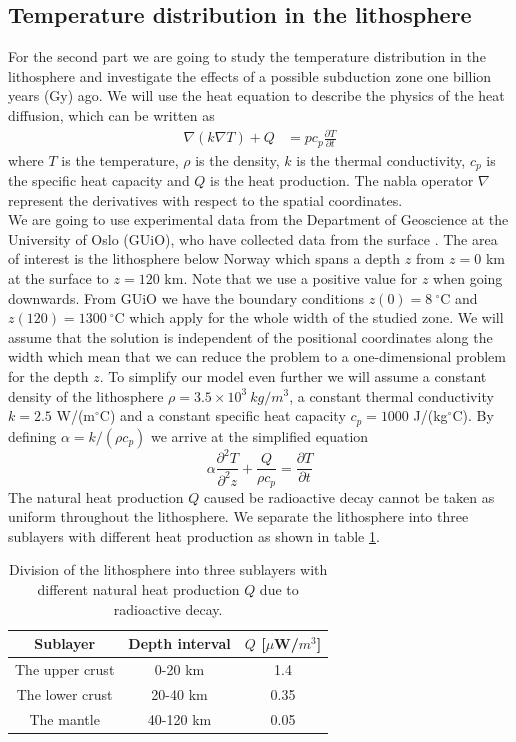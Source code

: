 \documentclass[%
 reprint,
nofootinbib,
aps,
]{revtex4-1}
\begin{document}
\subsection{Temperature distribution in the lithosphere}
For the second part we are going to study the temperature distribution in the lithosphere and investigate the effects of a possible subduction zone one billion years (Gy) ago. We will use the heat equation to describe the physics of the heat diffusion, which can be written as
 \begin{align*}
     \nabla(k\nabla T) + Q &= p c_p \frac{\partial T}{\partial t}
 \end{align*}
where $T$ is the temperature, $\rho$ is the density, $k$ is the thermal conductivity, $c_p$ is the specific heat capacity and $Q$ is the heat production. The nabla operator $\nabla$ represent the derivatives with respect to the spatial coordinates. \\
We are going to use experimental data from the Department of Geoscience at the University of Oslo (GUiO), who have collected data from the surface \cite{article}. The area of interest is the lithosphere below Norway which spans a depth $z$ from $z=0$ km at the surface to $z = 120$ km. Note that we use a positive value for $z$ when going downwards. From GUiO we have the boundary conditions $z(0) = 8 \ ^{\circ}$C and  $z(120) = 1300 \ ^{\circ}$C which apply for the whole width of the studied zone. We will assume that the solution is independent of the positional coordinates along the width which mean that we can reduce the problem to a one-dimensional problem for the depth $z$. To simplify our model even further we will assume a constant density of the lithosphere $\rho = 3.5 \times 10^3 \ kg/m^3$, a constant thermal conductivity $k = 2.5$ W/(m$^{\circ}$C) and a constant specific heat capacity $c_p = 1000$ J/(kg$^\circ$C). By defining $\alpha = k/(\rho c_p)$ we arrive at the simplified equation
\begin{equation}
    \alpha \frac{\partial^2 T}{\partial^2 z} + \frac{Q}{\rho c_p} = \frac{\partial T}{\partial t}
    \label{eq:Geo_HQ}
\end{equation}
The natural heat production $Q$ caused be radioactive decay cannot be taken as uniform throughout the lithosphere. We separate the lithosphere into three sublayers with different heat production as shown in table \ref{tab:sublayers}.

\begin{table}[H]
  \begin{center}
  \caption{Division of the lithosphere into three sublayers with different natural heat production $Q$ due to radioactive decay.}
  \begin{tabular}{|c|c|c|} \hline
      Sublayer & Depth interval &  $Q$ [$\mu$W/$m^3$]  \\ \hline
      The upper crust & 0-20 km & 1.4\\ \hline
      The lower crust & 20-40 km & 0.35\\ \hline
      The mantle & 40-120 km & 0.05 \\ \hline
  \end{tabular}
  \label{tab:sublayers}
  \end{center}
\end{table}
\end{document}
